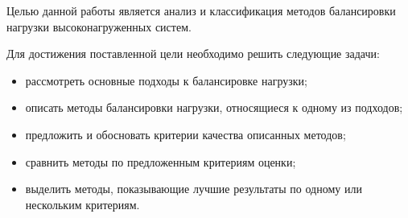 Целью данной работы является анализ и классификация методов балансировки нагрузки высоконагруженных систем.

Для достижения поставленной цели необходимо решить следующие задачи:
\begin{itemize}
    \item рассмотреть основные подходы к балансировке нагрузки;
    \item описать методы балансировки нагрузки, относящиеся к одному из подходов;
    \item предложить и обосновать критерии качества описанных методов;
    \item сравнить методы по предложенным критериям оценки;
    \item выделить методы, показывающие лучшие результаты по одному или нескольким критериям.
\end{itemize}

